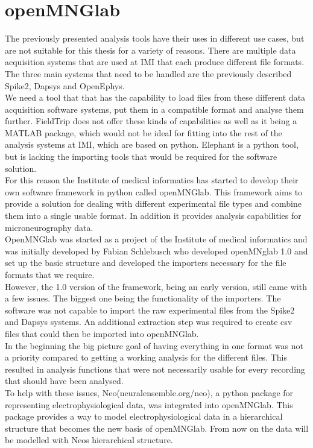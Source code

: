 \section{openMNGlab}
The previously presented analysis tools have their uses in different use cases, but are not suitable for this thesis for a variety of reasons.
There are multiple data acquisition systems that are used at IMI that each produce different file formats. The three main systems that need to be handled are the previously described Spike2, Dapsys and OpenEphys. \\ 
We need a tool that that has the capability to load files from these different data acquisition software systems, put them in a compatible format and analyse them further.  FieldTrip does not offer these kinds of capabilities as well as it being a MATLAB package, which would not be ideal for fitting into the rest of the analysis systems at IMI, which are based on python. Elephant is a python tool, but is lacking the importing tools that would be required for the software solution.  \\
For this reason the Institute of medical informatics has started to develop their own software framework in python called openMNGlab.  This framework aims to provide a solution for dealing with different experimental file types and combine them into a single usable format.  In addition it provides analysis capabilities for microneurography data. \\
OpenMNGlab was started as a project of the Institute of medical informatics and was initially developed by Fabian Schlebusch who developed openMNglab 1.0 and set up the basic structure and developed the importers necessary for the file formats that we require. \\
However, the 1.0 version of the framework, being an early version,  still came with a few issues. The biggest one being the functionality of the importers. The software was not capable to import the raw experimental files from the Spike2 and Dapsys systems. An additional extraction step was required to create csv files that could then be imported into openMNGlab. \\
In the beginning the big picture goal of having everything in one format was not a priority compared to getting a working analysis for the different files. This resulted in analysis functions that were not necessarily usable for every recording that should have been analysed.\\
To help with these issues, Neo(neuralensemble.org/neo), a python package for representing electrophysiological data, was integrated into openMNGlab. This package provides a way to model electrophysiological data in a hierarchical structure that becomes the new basis of openMNGlab. From now on the data will be modelled with Neos hierarchical structure. 
